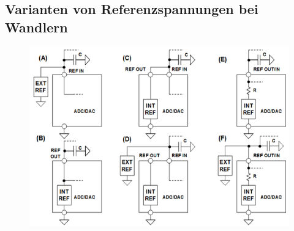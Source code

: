 \subsection{Varianten von Referenzspannungen bei Wandlern}
\begin{figure}[!h]
\includegraphics[scale=0.3]{pictures/variantenReferenzspannungen}
\end{figure}
\newpage

